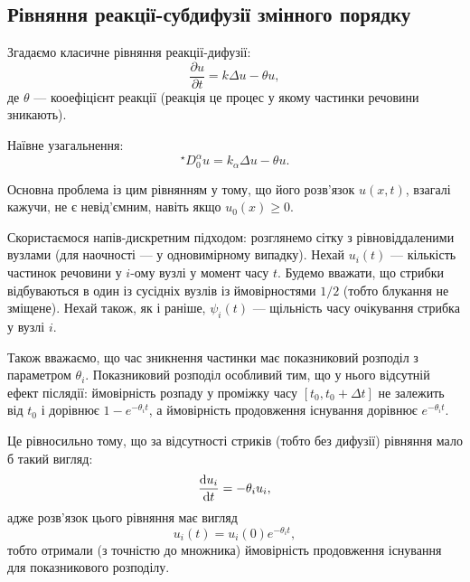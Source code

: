 
\subsection{Рівняння реакції-субдифузії змінного порядку}

Згадаємо класичне рівняння реакції-дифузії:
\begin{equation}
    \frac{\partial u}{\partial t} = k \Delta u - \theta u,
\end{equation}
де $\theta$ --- кооефіцієнт реакції (реакція це процес у якому частинки речовини зникають). \medskip

Наївне узагальнення:
\begin{equation}
    {}^\star D_0^\alpha u = k_\alpha \Delta u - \theta u.
\end{equation}

\begin{remark}
    Основна проблема із цим рівнянням у тому, що його розв'язок $u(x, t)$, взагалі кажучи, не є невід'ємним, навіть якщо $u_0(x) \ge 0$.
\end{remark}

Скористаємося напів-дискретним підходом: розглянемо сітку з рівновіддаленими вузлами (для наочності --- у одновимірному випадку). Нехай $u_i(t)$ --- кількість частинок речовини у $i$-ому вузлі у момент часу $t$. Будемо вважати, що стрибки відбуваються в один із сусідніх вузлів із ймовірностями $1/2$ (тобто блукання не зміщене). Нехай також, як і раніше, $\psi_i(t)$ --- щільність часу очікування стрибка у вузлі $i$. \medskip

Також вважаємо, що час зникнення частинки має показниковий розподіл з параметром $\theta_i$. Показниковий розподіл особливий тим, що у нього відсутній ефект післядії: ймовірність розпаду у проміжку часу $[t_0, t_0 + \Delta t]$ не залежить від $t_0$ і дорівнює $1 - e^{-\theta_i t}$, а ймовірність продовження існування дорівнює $e^{-\theta_i t}$. \medskip

Це рівносильно тому, що за відсутності стриків (тобто без дифузії) рівняння мало б такий вигляд:
\begin{equation}
    \frac{\mathop{}\!\mathrm{d} u_i}{\mathop{}\!\mathrm{d} t} = -\theta_i u_i,
\end{equation}
адже розв'язок цього рівняння має вигляд
\begin{equation}
    u_i(t) = u_i(0) e^{-\theta_i t},
\end{equation}
тобто отримали (з точністю до множника) ймовірність продовження існування для показникового розподілу. \medskip

